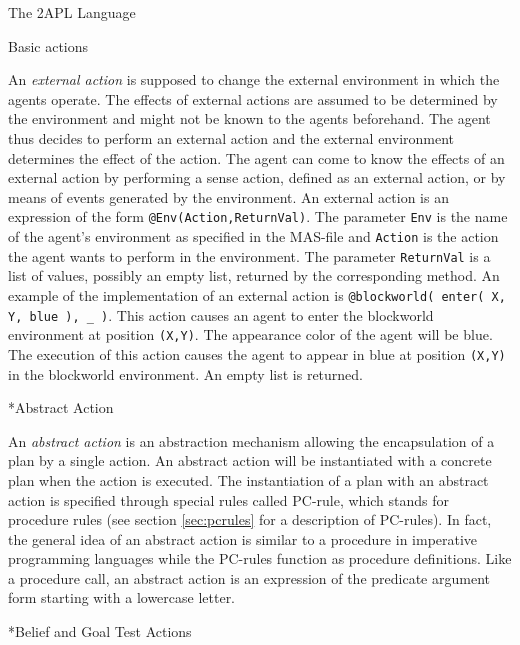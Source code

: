 \begin{chapter}{The 2APL Language}
\begin{section}{Basic actions}
\begin{subsection}
An \emph{external action} is supposed to change the external
environment in which the agents operate. The effects of external
actions are assumed to be determined by the environment and might
not be known to the agents beforehand. The agent thus decides to
perform an external action and the external environment determines
the effect of the action. The agent can come to know the effects of
an external action by performing a sense action, defined as an
external action, or by means of events generated by the environment.
An external action  is an expression of the form
{\tt @Env(Action,ReturnVal)}. The parameter {\tt Env} is the name of
the agent's environment as specified in the MAS-file and {\tt Action} 
is the action the agent
wants to perform in the environment. 
The parameter {\tt ReturnVal} is a list of values, possibly an empty list, returned by the
corresponding method. An example of the implementation of an
external action is {\tt @blockworld( enter( X, Y, blue ), \_ )}.
This action causes an agent to enter the blockworld environment at
position {\tt (X,Y)}. The appearance color of the agent will be
blue. The execution of this action causes the agent to appear in
blue at position {\tt (X,Y)} in the blockworld environment. An empty
list is returned.
\end{subsection}

\begin{subsection}*{Abstract Action}

An \emph{abstract action} is an abstraction mechanism allowing the
encapsulation of a plan by a single action. An abstract action will
be instantiated with a concrete plan when the action is executed.
The instantiation of a plan with an abstract action is specified
through special rules called PC-rule, which stands for procedure
rules (see section \ref{sec:pcrules} for a description of PC-rules).
In fact, the general idea of an abstract action is similar to a
procedure in imperative programming languages while the PC-rules
function as procedure definitions. Like a procedure call, an
abstract action  is an expression of the
predicate argument form starting with a lowercase letter.
\end{subsection}

\begin{subsection}*{Belief and Goal Test Actions}


\end{subsection}
\end{section}
\end{chapter}
